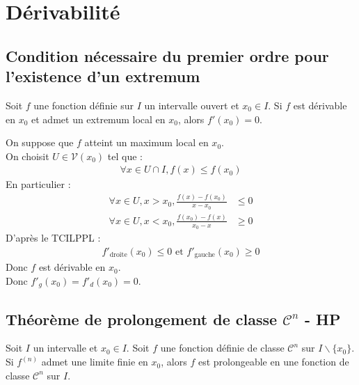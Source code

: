 \documentclass[../main.tex]{subfiles}
\begin{document}
\setcounter{chapter}{17}
\chapter{Dérivabilité}
\tableofcontents
\clearpage

\section{Condition nécessaire du premier ordre pour l'existence d'un extremum}
\begin{tcolorbox}[title=Théorème 18.13, title filled=false, colframe=orange, colback=orange!10!white]
    Soit $f$ une fonction définie sur $I$ un intervalle ouvert et $x_0 \in I$. Si $f$ est dérivable en $x_0$ et admet un extremum local en $x_0$, alors $f'(x_0) = 0$. 
\end{tcolorbox}

\noindent On suppose que $f$ atteint un maximum local en $x_0$. \\
On choisit $U \in \mathcal V(x_0)$ tel que : 
\begin{align*}
    \forall x \in U \cap I, f(x) \leq f(x_0)
\end{align*}
En particulier : 
\begin{align*}
    \forall x \in U, x > x_0, \frac{f(x) - f(x_0)}{x - x_0} &\leq 0 \\
    \forall x \in U, x < x_0, \frac{f(x_0) - f(x)}{x_0 - x} &\geq 0
\end{align*}
D'après le TCILPPL : 
\begin{align*}
    f'_{\text{droite}}(x_0) \leq 0 \text{ et } f'_{\text{gauche}}(x_0) \geq 0
\end{align*}
Donc $f$ est dérivable en $x_0$. \\
Donc $f'_g(x_0) = f'_d(x_0) = 0$. 

\section{Théorème de prolongement de classe $\mathcal{C}^n$ - HP}
\begin{tcolorbox}[title=Théorème 18.43 - HP, title filled=false, colframe=orange, colback=orange!10!white]
    Soit $I$ un intervalle et $x_0 \in I$. Soit $f$ une fonction définie de classe $\mathcal{C}^n$ sur $I\backslash \{x_0\}$. Si $f^{(n)}$ admet une limite finie en $x_0$, alors $f$ est prolongeable en une fonction de classe $\mathcal{C}^n$ sur $I$.
\end{tcolorbox}
\end{document}
